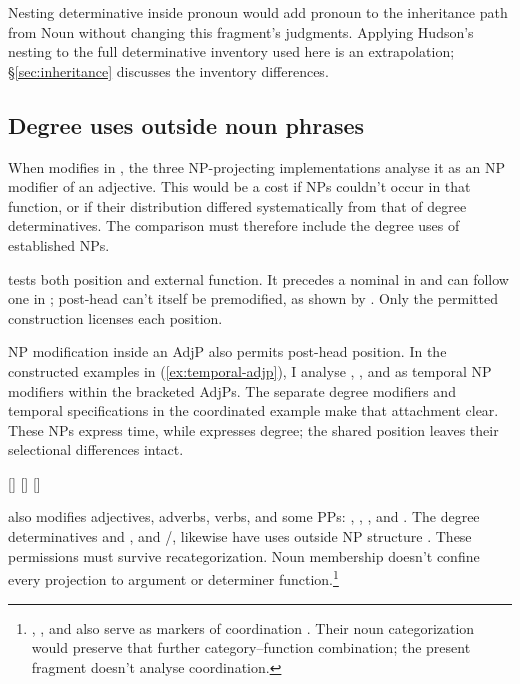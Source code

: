 \documentclass[12pt]{article}
\begin{document}
Nesting determinative inside pronoun would add pronoun to the inheritance path from Noun without changing this fragment's judgments. Applying Hudson's nesting to the full determinative inventory used here is an extrapolation; §\ref{sec:inheritance} discusses the inventory differences.


\subsection{Degree uses outside noun phrases}\label{sec:enough}

When  modifies  in , the three NP-projecting implementations analyse it as an NP modifier of an adjective. This would be a cost if NPs couldn't occur in that function, or if their distribution differed systematically from that of degree determinatives. The comparison must therefore include the degree uses of established NPs.

 tests both position and external function. It precedes a nominal in  and can follow one in ; post-head  can't itself be premodified, as shown by  \citep[396--397, 445]{huddleston2002}. Only the permitted construction licenses each position.

NP modification inside an AdjP also permits post-head position. In the constructed examples in (\ref{ex:temporal-adjp}), I analyse , , and  as temporal NP modifiers within the bracketed AdjPs. The separate degree modifiers and temporal specifications in the coordinated example make that attachment clear. These NPs express time, while  expresses degree; the shared position leaves their selectional differences intact.

\ea\label{ex:temporal-adjp}
\ea {} [] 
\ex {} []  [] 
\z\z

 also modifies adjectives, adverbs, verbs, and some PPs: , , , and  \citep[396--397]{huddleston2002}. The degree determinatives  and , and /, likewise have uses outside NP structure \citep[390, 395--397]{huddleston2002}. These permissions must survive recategorization. Noun membership doesn't confine every projection to argument or determiner function.\footnote{, , and  also serve as markers of coordination \citep[1305, 1308]{huddleston2002}. Their noun categorization would preserve that further category--function combination; the present fragment doesn't analyse coordination.}
\end{document}

